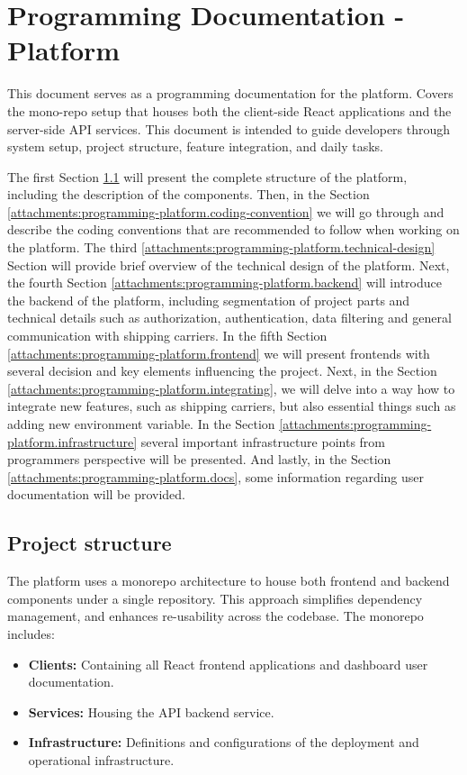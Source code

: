 \chapter{Programming Documentation - Platform}
\label{attachments:programming-platform}
This document serves as a programming documentation for the platform.
Covers the mono-repo setup that houses both the client-side React applications and the server-side API services.
This document is intended to guide developers through system setup, project structure, feature integration, and daily tasks.

The first Section \ref{attachments:programming-platform.project-structure} will present the complete structure of the platform, including the description of the components.
Then, in the Section \ref{attachments:programming-platform.coding-convention} we will go through and describe the coding conventions that are recommended to follow when working on the platform.
The third \ref{attachments:programming-platform.technical-design} Section will provide brief overview of the technical design of the platform.
Next, the fourth Section \ref{attachments:programming-platform.backend} will introduce the backend of the platform, including segmentation of project parts and technical details such as authorization, authentication, data filtering and general communication with shipping carriers.
In the fifth Section \ref{attachments:programming-platform.frontend} we will present frontends with several decision and key elements influencing the project.
Next, in the Section \ref{attachments:programming-platform.integrating}, we will delve into a way how to integrate new features, such as shipping carriers, but also essential things such as adding new environment variable.
In the Section \ref{attachments:programming-platform.infrastructure} several important infrastructure points from programmers perspective will be presented.
And lastly, in the Section \ref{attachments:programming-platform.docs}, some information regarding user documentation will be provided. 


\section{Project structure}
\label{attachments:programming-platform.project-structure}
The platform uses a monorepo architecture to house both frontend and backend components under a single repository.
This approach simplifies dependency management, and enhances re-usability across the codebase.
The monorepo includes:
\begin{itemize}
    \item \textbf{Clients:} Containing all React frontend applications and dashboard user documentation.
    \item \textbf{Services:} Housing the API backend service.
    \item \textbf{Infrastructure:} Definitions and configurations of the deployment and operational infrastructure.
\end{itemize}


